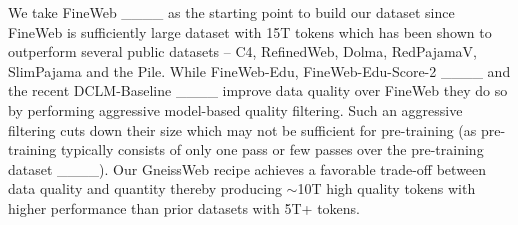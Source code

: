 We take FineWeb ____ as the starting point to build our dataset since FineWeb is sufficiently large dataset with 15T tokens which has been shown to outperform several public datasets -- C4, RefinedWeb, Dolma, RedPajamaV, SlimPajama and the Pile.
While FineWeb-Edu, FineWeb-Edu-Score-2 ____ and the recent DCLM-Baseline ____ improve data quality over FineWeb they do so by performing aggressive model-based quality filtering. Such an aggressive filtering cuts down their size which may not be sufficient for pre-training (as pre-training typically consists of only one pass or few passes over the pre-training dataset ____). Our GneissWeb recipe achieves a favorable trade-off between data quality and quantity thereby producing $\sim$10T high quality tokens with higher performance than prior datasets with 5T+ tokens.  





